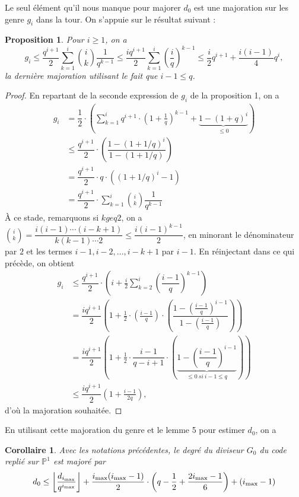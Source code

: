 \documentclass[10pt]{article}
\newtheorem{prop1}{Proposition}[]
\newtheorem{coro1}{Corollaire}[]
\newcommand{\cd}{\cdot}
\newcommand{\ii}{i_{\rm{max}}}
\begin{document}
Le seul élément qu'il nous manque pour majorer $d_0$ est une majoration sur les genre $g_i$ dans la tour. On s'appuie sur le résultat suivant :

\begin{prop1}
Pour $i \geq 1$, on a
\[g_i \leq \dfrac{q^{i+1}}{2} \sum\limits_{k=1}^i \binom{i}{k} \dfrac{1}{q^{k-1}} \leq \dfrac{iq^{i+1}}{2} \sum\limits_{k=1}^i \left(\dfrac{i}{q}\right)^{k-1} \leq \dfrac{i}{2}q^{i+1} + \dfrac{i(i-1)}{4}q^i,\]
la dernière majoration utilisant le fait que $i-1 \leq q$.
\end{prop1}

\begin{proof}
En repartant de la seconde expression de $g_i$ de la proposition 1, on a 
\begin{align*}
g_i  &=\dfrac{1}{2} \cd \left(\sum\limits_{k=1}^i q^{i+1} \cd \left(1+\frac{1}{q}\right)^{k-1} +\underbrace{1 -(1+q)^i}_{\leq 0}\right) \\
	&\leq \dfrac{q^{i+1}}{2} \cd \left(\dfrac{1-(1+1/q)^i}{1-(1+1/q)}\right) \\
	& = \dfrac{q^{i+1}}{2} \cd q \cd ((1+1/q)^i-1) \\
	& = \dfrac{q^{i+1}}{2} \cd \sum\limits_{k=1}^i \binom{i}{k} \dfrac{1}{q^{k-1}}
\end{align*}
À ce stade, remarquons si $k geq 2$, on a $\binom{i}{k} = \dfrac{i(i-1) \cdots (i-k+1)}{k(k-1) \cdots 2} \leq \dfrac{i(i-1)^{k-1}}{2}$, en minorant le dénominateur par $2$ et les termes $i-1,i-2,...,i-k+1$ par $i-1$. En réinjectant dans ce qui précède, on obtient
\begin{align*}
g_i &\leq \dfrac{q^{i+1}}{2} \cd \left( i + \frac{i}{2} \sum\limits_{k=2}^i \left(\dfrac{i-1}{q}\right)^{k-1}\right) \\
	&= \dfrac{iq^{i+1}}{2} \left( 1 + \frac{1}{2} \cd \left(\frac{i-1}{q}\right) \cd \left(\dfrac{1-(\frac{i-1}{q})^{i-1}}{1-(\frac{i-1}{q})}\right)\right) \\
		&= \dfrac{iq^{i+1}}{2} \left( 1 + \frac{1}{2} \cd \dfrac{i-1}{q-i+1} \cd \left(\underbrace{1- \left(\dfrac{i-1}{q}\right)^{i-1}}_{\leq 0 \ si \ i-1 \leq q}\right)\right) \\
	& \leq \dfrac{iq^{i+1}}{2} \left( 1 + \frac{i-1}{2q}\right),
\end{align*}
d'où la majoration souhaitée.
\end{proof}

En utilisant cette majoration du genre et le lemme 5 pour estimer $d_0$, on a 

\begin{coro1}
Avec les notations précédentes, le degré du diviseur $G_0$ du code replié sur $\mathbb{P}^1$ est majoré par 
\[d_0 \leq \left\lfloor \dfrac{d_{\ii}}{q^{\ii}}\right\rfloor + \dfrac{\ii(\ii-1)}{2}\cd \left(q-\frac{1}{2} + \frac{2\ii-1}{6}\right) + (\ii-1)  \]
\end{coro1}
\end{document}
